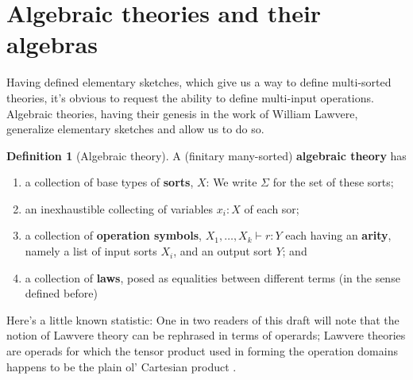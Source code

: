 \documentclass[12pt,twoside]{reedthesis}
\theoremstyle{definition}
\newtheorem{definition}{Definition}
\theoremstyle{remark}
\theoremstyle{theorem}
\begin{document}
\section{Algebraic theories and their algebras}
Having defined elementary sketches, which give us a way to define multi-sorted
theories, it's obvious to request the ability to define multi-input operations.
Algebraic theories, having their genesis in the work of William Lawvere,
generalize elementary sketches and allow us to do so.
\begin{definition}[Algebraic theory]
  A (finitary many-sorted) \textbf{algebraic theory}  has
  \begin{enumerate}
    \item a collection of base types of \textbf{sorts}, $X$: We write $\Sigma$ for the set of these sorts;
    \item an inexhaustible collecting of variables $x_{i}:X$ of each sor;
    \item a collection of \textbf{operation symbols}, $X_{1},\dots , X_{k} \vdash r : Y$ each having an \textbf{arity}, namely a list of input sorts $X_{i}$, and an output sort $Y$; and
    \item a collection of \textbf{laws}, posed as equalities between different
          terms (in the sense defined before)
  \end{enumerate}
\end{definition}
Here's a little known statistic: One in two readers of this draft will note that
the notion of Lawvere theory can be rephrased in terms of operards; Lawvere
theories are operads for which the tensor product used in forming the operation
domains happens to be the plain ol' Cartesian product \cite{TODO: Nlab}.
\end{document}
